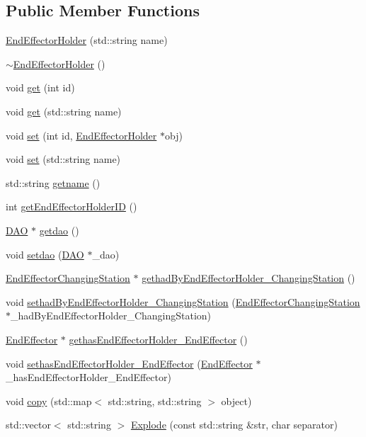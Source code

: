 \subsection*{Public Member Functions}
\begin{DoxyCompactItemize}
\item 
\hyperlink{class_end_effector_holder_aabfb947bc9af94b03f8e46eda5b62edb}{EndEffectorHolder} (std::string name)
\item 
\hyperlink{class_end_effector_holder_acb01612d62d5dd488ebe98cb61910eb2}{$\sim$EndEffectorHolder} ()
\item 
void \hyperlink{class_end_effector_holder_ad0dbbd16bec954034fd2abb79fb73d0e}{get} (int id)
\item 
void \hyperlink{class_end_effector_holder_aaf0dbf799f0b9fd3e572d771ab57486a}{get} (std::string name)
\item 
void \hyperlink{class_end_effector_holder_aebd77d31532e7781ecf0a20b8b64fe92}{set} (int id, \hyperlink{class_end_effector_holder}{EndEffectorHolder} $\ast$obj)
\item 
void \hyperlink{class_end_effector_holder_ae9b1cf29924a228c717a80c9c7d52ad1}{set} (std::string name)
\item 
std::string \hyperlink{class_end_effector_holder_aa5d7eefe717071af41c4147be2f97367}{getname} ()
\item 
int \hyperlink{class_end_effector_holder_aaafdd90bb5553c2e57fba9215a762d4e}{getEndEffectorHolderID} ()
\item 
\hyperlink{class_d_a_o}{DAO} $\ast$ \hyperlink{class_end_effector_holder_ae7baa5588703159a0626a88b4960a48b}{getdao} ()
\item 
void \hyperlink{class_end_effector_holder_aa8967878b465440e3a9b3f510e00c522}{setdao} (\hyperlink{class_d_a_o}{DAO} $\ast$\_\-dao)
\item 
\hyperlink{class_end_effector_changing_station}{EndEffectorChangingStation} $\ast$ \hyperlink{class_end_effector_holder_a378b5e9935b69bc6775f8902fda0d15c}{gethadByEndEffectorHolder\_\-ChangingStation} ()
\item 
void \hyperlink{class_end_effector_holder_ab945fdd561bcbf5bd08ed8c3b9575999}{sethadByEndEffectorHolder\_\-ChangingStation} (\hyperlink{class_end_effector_changing_station}{EndEffectorChangingStation} $\ast$\_\-hadByEndEffectorHolder\_\-ChangingStation)
\item 
\hyperlink{class_end_effector}{EndEffector} $\ast$ \hyperlink{class_end_effector_holder_a1c94ed7c7106a087630a1b505a799301}{gethasEndEffectorHolder\_\-EndEffector} ()
\item 
void \hyperlink{class_end_effector_holder_a5af04e3befc3daab003fce9c90b8aa03}{sethasEndEffectorHolder\_\-EndEffector} (\hyperlink{class_end_effector}{EndEffector} $\ast$\_\-hasEndEffectorHolder\_\-EndEffector)
\item 
void \hyperlink{class_end_effector_holder_ac71fd774314e2b9fae1eaec2766f76c3}{copy} (std::map$<$ std::string, std::string $>$ object)
\item 
std::vector$<$ std::string $>$ \hyperlink{class_end_effector_holder_a546629be372fbe9e5f8afd73fc36fd7b}{Explode} (const std::string \&str, char separator)
\end{DoxyCompactItemize}


